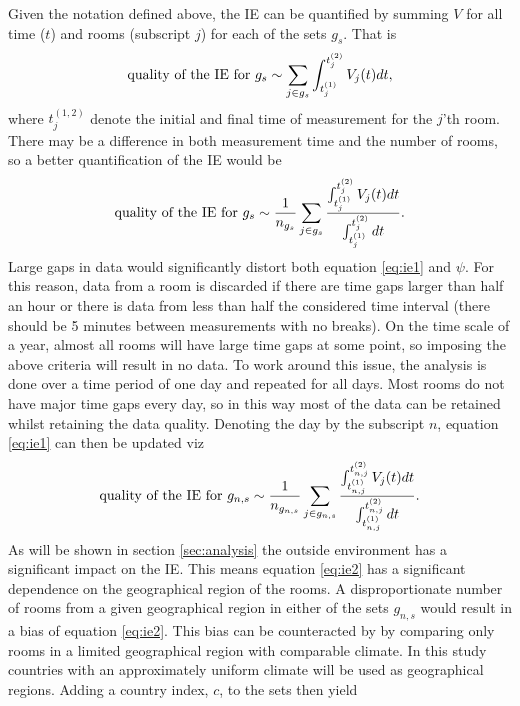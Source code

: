 \documentclass[fleqn,usenatbib,nofootinbib]{revtex4-2}
\begin{document}
	Given the notation defined above, the IE can be quantified by summing $V$ for all time ($t$) and rooms (subscript $j$) for each of the sets $g_s$. That is
	\begin{equation}
		\text{\rm quality of the IE for $g_s$} \sim \sum_{j\in g_s}\int_{t_j^{(1)}}^{t_j^{(2)}}V_{j}(t)dt,
		\label{eq:ie0}
	\end{equation}
	where $t_j^{(1,2)}$ denote the initial and final time of measurement for the $j$'th room. There may be a difference in both measurement time and the number of rooms, so a better quantification of the IE would be 
	\begin{equation}
		\text{\rm quality of the IE for $g_s$} \sim \frac{1}{n_{g_s}}\sum_{j\in g_s}\frac{\int_{t_j^{(1)}}^{t_j^{(2)}}V_{j}(t)dt}{\int_{t_j^{(1)}}^{t_j^{(2)}}dt}.
		\label{eq:ie1}
	\end{equation}
	Large gaps in data would significantly distort both equation \eqref{eq:ie1} and $\psi$. For this reason, data from a room is discarded if there are time gaps larger than half an hour or there is data from less than half the considered time interval (there should be 5 minutes between measurements with no breaks). On the time scale of a year, almost all rooms will have large time gaps at some point, so imposing the above criteria will result in no data. To work around this issue, the analysis is done over a time period of one day and repeated for all days. Most rooms do not have major time gaps every day, so in this way most of the data can be retained whilst retaining the data quality. Denoting the day by the subscript $n$, equation \eqref{eq:ie1} can then be updated viz
	\begin{equation}
		\text{\rm quality of the IE for $g_{n,s}$} \sim \frac{1}{n_{g_{n,s}}}\sum_{j\in g_{n,s}}\frac{\int_{t_{n,j}^{(1)}}^{t_{n,j}^{(2)}}V_{j}(t)dt}{\int_{t_{n,j}^{(1)}}^{t_{n,j}^{(2)}}dt}.
		\label{eq:ie2}
	\end{equation}
	As will be shown in section \ref{sec:analysis} the outside environment has a significant impact on the IE. This means equation \eqref{eq:ie2} has a significant dependence on the geographical region of the rooms. A disproportionate number of rooms from a given geographical region in either of the sets $g_{n,s}$ would result in a bias of equation \eqref{eq:ie2}. This bias can be counteracted by by comparing only rooms in a limited geographical region with comparable climate. In this study countries with an approximately uniform climate will be used as geographical regions. Adding a country index, $c$, to the sets then yield
\end{document}
